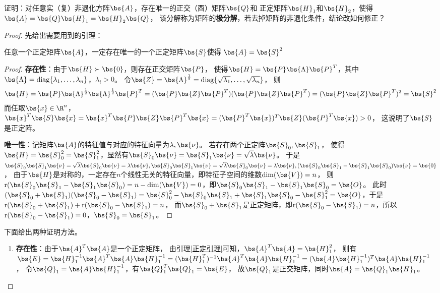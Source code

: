 \documentclass[12pt, a4paper, oneside, UTF8]{ctexbook}
\begin{document}
\begin{question}
    证明：对任意实（复）非退化方阵$\bs{A}$，存在唯一的正交（酉）矩阵$\bs{Q}$和
    正定矩阵$\bs{H}_1$和$\bs{H}_2$，使得$\bs{A}=\bs{Q}\bs{H}_1=\bs{H}_2\bs{Q}$，
    该分解称为矩阵的\textbf{极分解}，若去掉矩阵的非退化条件，结论改如何修正？
\end{question}


\begin{proof}
    先给出需要用到的引理：
    \begin{lemma} \label{正定引理}
        任意一个正定矩阵$\bs{A}$，一定存在唯一的一个正定矩阵$\bs{S}$使得
        $\bs{A}=\bs{S}^2$
    \end{lemma}
    \begin{proof}
        \textbf{存在性}：由于$\bs{H} \succ \bs{0}$，则存在正交矩阵$\bs{P}$，
        使得$\bs{H}=\bs{P}\bs{\Lambda}\bs{P}^T$，其中$\bs{\Lambda}
        =\mathrm{diag}\{\lambda_1,\ldots,\lambda_n\}$，$\lambda_i > 0$。
        令$\bs{Z}=\bs{\Lambda}^{\frac{1}{2}}=\mathrm{diag}\{\sqrt{\lambda_1},\ldots,\sqrt{\lambda_n}\}$，
        则
        \begin{align*}
            \bs{H}=\bs{P}\bs{\Lambda}^{\frac{1}{2}}\bs{\Lambda}^{\frac{1}{2}}\bs{P}^T=(\bs{P}\bs{Z}\bs{P}^T)(\bs{P}\bs{Z}\bs{P}^T)
            =(\bs{P}\bs{Z}\bs{P}^T)^2=\bs{S}^2
        \end{align*}
        而任取$\bs{x}\in \R^n$，$\bs{x}^T\bs{S}\bs{x}=
        \bs{x}^T\bs{P}\bs{Z}\bs{P}^T\bs{x}=
        (\bs{P}^T\bs{x})^T\bs{Z}(\bs{P}^T\bs{x}) >0$，
        这说明了$\bs{S}$是正定阵。

        \textbf{唯一性}：记矩阵$\bs{A}$的特征值与对应的特征向量为$\lambda,\bs{\nu}$。
        若存在两个正定阵$\bs{S}_0,\bs{S}_1$，
        使得$\bs{H}=\bs{S}_0^2=\bs{S}_1^2$，显然有$\bs{S}_0\bs{\nu}=\bs{S}_1\bs{\nu}=\sqrt{\lambda}\bs{\nu}$。
        于是$\bs{S}_0\bs{S}_1\bs{\nu}=\sqrt{\lambda}\bs{S}_0\bs{\nu}=\lambda \bs{\nu},
        \bs{S}_0\bs{S}_1\bs{\nu}=\sqrt{\lambda}\bs{S}_0\bs{\nu}=\lambda \bs{\nu},
        (\bs{S}_0\bs{S}_1-\bs{S}_1\bs{S}_0)\bs{\nu}=\bs{0}$，
        由于$\bs{H}$是对称的，一定存在$n$个线性无关的特征向量，即特征子空间的维数$\mathrm{dim}(\bs{V})=n$，
        则$\mathrm{r}(\bs{S}_0\bs{S}_1-\bs{S}_1\bs{S}_0)=n-\mathrm{dim}(\bs{V})=0$，即$\bs{S}_0\bs{S}_1-\bs{S}_1\bs{S}_0=\bs{O}$。
        此时$(\bs{S}_0+\bs{S}_1)(\bs{S}_0-\bs{S}_1)=\bs{S}_0^2-\bs{S}_0\bs{S}_1+\bs{S}_1\bs{S}_0-\bs{S}_1^2=\bs{O}$，于是$\mathrm{r}(\bs{S}_0+\bs{S}_1)+\mathrm{r}(\bs{S}_0-\bs{S}_1)=n$，
        而$\bs{S}_0+\bs{S}_1$是正定矩阵，即$\mathrm{r}(\bs{S}_0-\bs{S}_1)=n$，所以$\mathrm{r}(\bs{S}_0-\bs{S}_1)=0$，$\bs{S}_0=\bs{S}_1$。
    \end{proof}
    下面给出两种证明方法。
    \begin{enumerate}[label=(\arabic*)]
        \item 
    \textbf{存在性}：由于$\bs{A}^T\bs{A}$是一个正定矩阵，
    由引理\ref{正定引理}可知，$\bs{A}^T\bs{A}=\bs{H}_1^2$，
    则有$\bs{E}=\bs{H}_1^{-1}\bs{A}^T\bs{A}\bs{H}_1^{-1}=
    (\bs{H}_1^T)^{-1}\bs{A}^T\bs{A}\bs{H}_1^{-1}
    =(\bs{A}\bs{H}_1^{-1})^T\bs{A}\bs{H}_1^{-1}$，
    令$\bs{Q}_1=\bs{A}\bs{H}_1^{-1}$，有$\bs{Q}_1^T\bs{Q}_1=\bs{E}$，
    故$\bs{Q}_1$是正交矩阵，同时$\bs{A}=\bs{Q}_1\bs{H}_1$。
    

\end{enumerate}
\end{proof}
\end{document}
